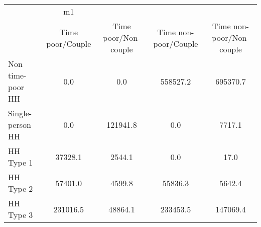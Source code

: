 \begin{tabular}{l*{4}{c}}
\hline\hline
            &          m1&            &            &            \\
            &Time poor/Couple&Time poor/Non-couple&Time non-poor/Couple&Time non-poor/Non-couple\\
\hline
Non time-poor HH&         0.0&         0.0&    558527.2&    695370.7\\
Single-person HH&         0.0&    121941.8&         0.0&      7717.1\\
HH Type 1   &     37328.1&      2544.1&         0.0&        17.0\\
HH Type 2   &     57401.0&      4599.8&     55836.3&      5642.4\\
HH Type 3   &    231016.5&     48864.1&    233453.5&    147069.4\\
\hline\hline
\end{tabular}
